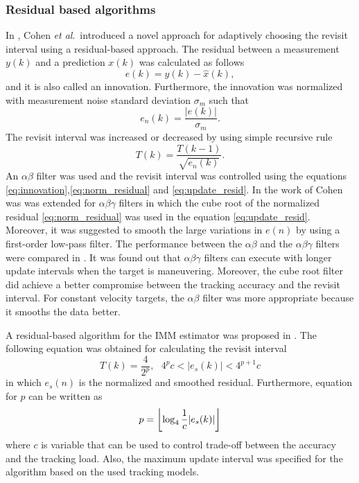 \documentclass[11pt,a4paper]{article}
\newcommand{\etal}{\textit{et al}.~}
\DeclarePairedDelimiter\floor{\lfloor}{\rfloor}
\begin{document}
\subsubsection{Residual based algorithms}

In \cite{Cohen1986}, Cohen \etal introduced a novel approach for adaptively choosing the revisit interval using a residual-based approach.
The residual between a measurement $y(k)$ and a prediction $x(k)$ was calculated as follows
\begin{equation}\label{eq:innovation}
    e(k) = y(k) - \hat{x}(k),
\end{equation}
and it is also called an innovation.
Furthermore, the innovation was normalized with measurement noise standard deviation $\sigma_m$ such that 
\begin{equation}\label{eq:norm_residual}
    e_n(k) = \frac{|e(k)|}{\sigma_m}.
\end{equation}
The revisit interval was increased or decreased by using simple recursive rule 
\begin{equation}\label{eq:update_resid}
    T(k) = \frac{T(k-1)}{\sqrt{e_n(k)}}.
\end{equation}
An $\alpha \beta$ filter was used and the revisit interval was controlled using the equations \eqref{eq:innovation},\eqref{eq:norm_residual} and \eqref{eq:update_resid}.
In \cite{Gardner1988} the work of Cohen was was extended for $\alpha\beta\gamma$ filters in which the cube root of the normalized residual \eqref{eq:norm_residual} was used in the equation \eqref{eq:update_resid}.
Moreover, it was suggested to smooth the large variations in $e(n)$ by using a first-order low-pass filter.
The performance between the $\alpha\beta$ and the $\alpha\beta\gamma$ filters were compared in \cite{Munu1992}.
It was found out that $\alpha\beta\gamma$ filters can execute with longer update intervals when the target is maneuvering.
Moreover, the cube root filter did achieve a better compromise between the tracking accuracy and the revisit interval.     
For constant velocity targets, the $\alpha\beta$ filter was more appropriate because it smooths the data better.

A residual-based algorithm for the IMM estimator was proposed in \cite{ChengTing2007}.
The following equation was obtained for calculating the revisit interval
\begin{equation}
    T(k) = \frac{4}{2^p}, \text{ } 4^p c < |e_s(k)| < 4^{p+1}c
\end{equation}
in which $e_s(n)$ is the normalized and smoothed residual.
Furthermore, equation for $p$ can be written as
\begin{equation}
    p = \floor*{\log_4\frac{1}{c}|e_s(k)|}
\end{equation}
where $c$ is variable that can be used to control trade-off between the accuracy and the tracking load.
Also, the maximum update interval was specified for the algorithm based on the used tracking models.
\end{document}
